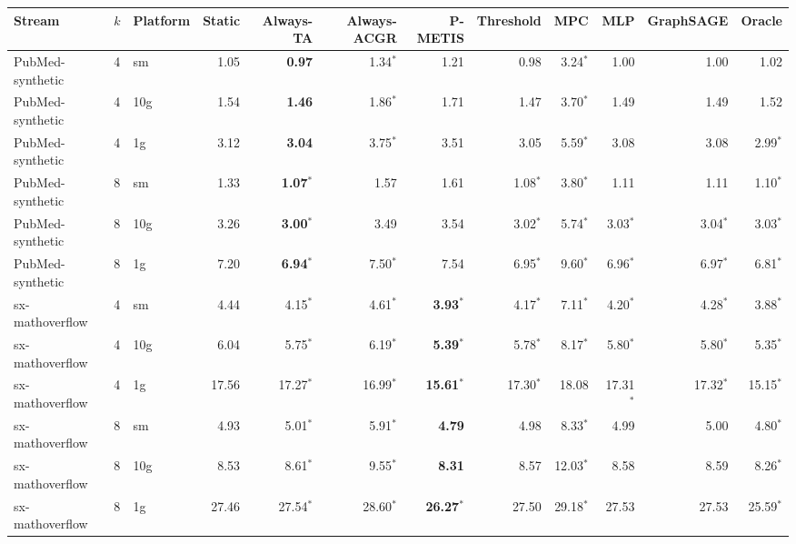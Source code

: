 \begin{tabular}{lllrrrrrrrrr}
\toprule
Stream & $k$ & Platform & Static & Always-TA & Always-ACGR & P-METIS & Threshold & MPC & MLP & GraphSAGE & Oracle \\
\midrule
PubMed-synthetic & 4 & sm & 1.05 & \textbf{0.97} & 1.34$^{*}$ & 1.21 & 0.98 & 3.24$^{*}$ & 1.00 & 1.00 & 1.02 \\
PubMed-synthetic & 4 & 10g & 1.54 & \textbf{1.46} & 1.86$^{*}$ & 1.71 & 1.47 & 3.70$^{*}$ & 1.49 & 1.49 & 1.52 \\
PubMed-synthetic & 4 & 1g & 3.12 & \textbf{3.04} & 3.75$^{*}$ & 3.51 & 3.05 & 5.59$^{*}$ & 3.08 & 3.08 & 2.99$^{*}$ \\
PubMed-synthetic & 8 & sm & 1.33 & \textbf{1.07}$^{*}$ & 1.57 & 1.61 & 1.08$^{*}$ & 3.80$^{*}$ & 1.11 & 1.11 & 1.10$^{*}$ \\
PubMed-synthetic & 8 & 10g & 3.26 & \textbf{3.00}$^{*}$ & 3.49 & 3.54 & 3.02$^{*}$ & 5.74$^{*}$ & 3.03$^{*}$ & 3.04$^{*}$ & 3.03$^{*}$ \\
PubMed-synthetic & 8 & 1g & 7.20 & \textbf{6.94}$^{*}$ & 7.50$^{*}$ & 7.54 & 6.95$^{*}$ & 9.60$^{*}$ & 6.96$^{*}$ & 6.97$^{*}$ & 6.81$^{*}$ \\
sx-mathoverflow & 4 & sm & 4.44 & 4.15$^{*}$ & 4.61$^{*}$ & \textbf{3.93}$^{*}$ & 4.17$^{*}$ & 7.11$^{*}$ & 4.20$^{*}$ & 4.28$^{*}$ & 3.88$^{*}$ \\
sx-mathoverflow & 4 & 10g & 6.04 & 5.75$^{*}$ & 6.19$^{*}$ & \textbf{5.39}$^{*}$ & 5.78$^{*}$ & 8.17$^{*}$ & 5.80$^{*}$ & 5.80$^{*}$ & 5.35$^{*}$ \\
sx-mathoverflow & 4 & 1g & 17.56 & 17.27$^{*}$ & 16.99$^{*}$ & \textbf{15.61}$^{*}$ & 17.30$^{*}$ & 18.08 & 17.31$^{*}$ & 17.32$^{*}$ & 15.15$^{*}$ \\
sx-mathoverflow & 8 & sm & 4.93 & 5.01$^{*}$ & 5.91$^{*}$ & \textbf{4.79} & 4.98 & 8.33$^{*}$ & 4.99 & 5.00 & 4.80$^{*}$ \\
sx-mathoverflow & 8 & 10g & 8.53 & 8.61$^{*}$ & 9.55$^{*}$ & \textbf{8.31} & 8.57 & 12.03$^{*}$ & 8.58 & 8.59 & 8.26$^{*}$ \\
sx-mathoverflow & 8 & 1g & 27.46 & 27.54$^{*}$ & 28.60$^{*}$ & \textbf{26.27}$^{*}$ & 27.50 & 29.18$^{*}$ & 27.53 & 27.53 & 25.59$^{*}$ \\
\bottomrule
\end{tabular}
